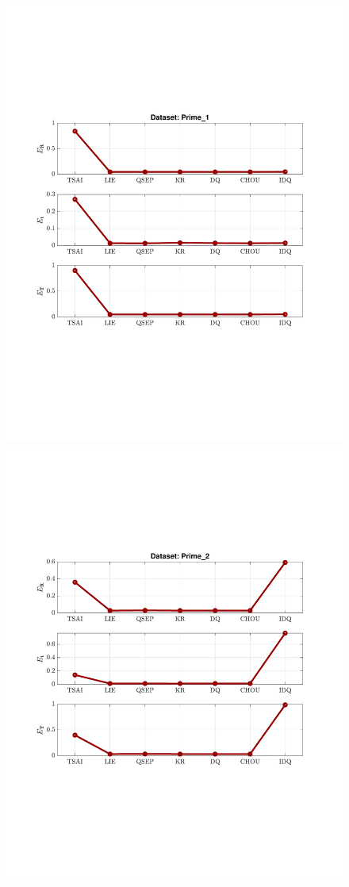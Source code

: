 \documentclass[a4paper]{report}
\begin{document}
\begin{figure}
\centering
\includegraphics[scale=0.7]{./hand_eye_figures/real/Result_Prime_1}
\includegraphics[scale=0.7]{./hand_eye_figures/real/Result_Prime_2}

\end{figure}
\end{document}
